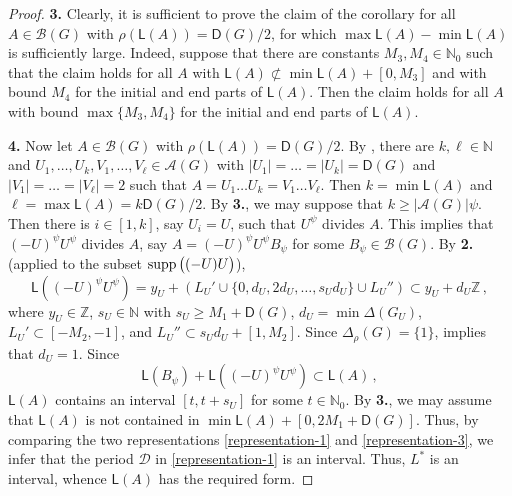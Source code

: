 \documentclass[a4paper,10pt]{amsart}
\theoremstyle{plain}
\theoremstyle{definition}
\newcommand{\N}{\mathbb N}
\newcommand{\Z}{\mathbb Z}
\numberwithin{equation}{section}
\begin{document}
\begin{proof}
\smallskip
\noindent
{\bf 3.} Clearly, it is sufficient to prove the claim of the corollary for all $A \in \mathcal B (G)$ with $\rho ( \mathsf L (A)) = \mathsf D (G)/2$, for which $\max \mathsf L (A) - \min \mathsf L (A)$ is sufficiently large. Indeed, suppose that there are constants $M_3, M_4 \in \N_0$ such that the claim holds for all $A$ with $\mathsf L (A) \not\subset \min \mathsf L (A) + [0, M_3]$ and with bound $M_4$ for the initial and end parts of $\mathsf L (A)$. Then the claim holds for all $A$ with bound $\max \{M_3, M_4\}$ for the initial and end parts of $\mathsf L (A)$.

\smallskip
\noindent
{\bf 4.} Now let $A \in \mathcal B (G)$ with $\rho ( \mathsf L (A)) = \mathsf D (G)/2$. By \cite[Lemma 3.2.(a)]{Ge-Zh18a}, there are $k, \ell \in \N$ and $U_1, \ldots, U_k, V_1, \ldots, V_{\ell} \in \mathcal A (G)$ with $|U_1|= \ldots = |U_k|= \mathsf D (G)$ and $|V_1| = \ldots = |V_{\ell}|=2$ such that $A = U_1 \ldots U_k = V_1 \ldots V_{\ell}$.  Then $k = \min \mathsf L (A)$ and $\ell = \max \mathsf L (A) = k \mathsf D (G)/2$. By {\bf 3.}, we may suppose that $k \ge |\mathcal A (G)| \psi$. Then there is $i \in [1,k]$, say $U_i = U$, such that  $U^{\psi}$ divides $A$. This implies that $(-U)^{\psi}U^{\psi}$ divides $A$, say $A = (-U)^{\psi}U^{\psi}B_{\psi}$ for some $B_{\psi} \in \mathcal B (G)$.
By {\bf 2.} (applied to the subset $\operatorname{supp} \big( (-U)U \big)$),
\begin{equation} \label{representation-3}
\mathsf L ( (-U)^{\psi}U^{\psi}) = y_U + (L_U' \cup \{0,d_U , 2 d_U, \ldots, s_U d_U \} \cup L_U'') \subset y_U + d_U \Z \,,
\end{equation}
where $y_{U} \in \Z$, $s_U \in \N$ with $s_U \ge M_1+\mathsf D (G)$, $d_U = \min \Delta (G_U)$, $L_U' \subset [-M_2, -1]$, and $L_U'' \subset s_U d_U + [1, M_2]$. Since $\Delta_{\rho} (G) = \{1\}$, \cite[Corollary 3.3]{Ge-Zh18a} implies that $d_U=1$. Since
\[
\mathsf L (B_{\psi}) + \mathsf L ( (-U)^{\psi} U^{\psi}) \subset \mathsf L (A) \,,
\]
$\mathsf L (A)$ contains an interval $[t, t+s_U]$ for some $t \in \N_0$.
By {\bf 3.}, we may assume that $\mathsf L (A)$ is not contained in $\min \mathsf L (A) +  [0, 2M_1+\mathsf D (G)]$. Thus, by comparing the two representations \eqref{representation-1} and \eqref{representation-3}, we infer that the period  $\mathcal D$ in \eqref{representation-1} is an interval. Thus, $L^*$ is an interval, whence $\mathsf L (A)$ has the required form.
\end{proof}
\end{document}
